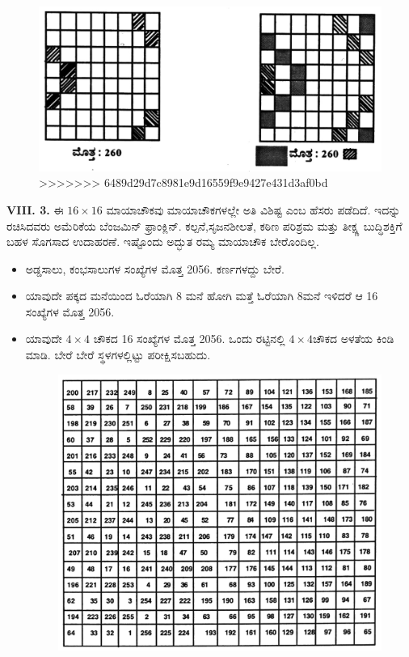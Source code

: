 \begin{figure}[H]
\includegraphics[scale=0.85]{src/figures/chap7/fig7.6.jpg}
>>>>>>> 6489d29d7c8981e9d16559f9e9427e431d3af0bd
\end{figure}

\textbf{VIII. 3.} ಈ $16 \times 16$ ಮಾಯಾಚೌಕವು ಮಾಯಾಚೌಕಗಳಲ್ಲೇ ಅತಿ ವಿಶಿಷ್ಟ ಎಂಬ ಹೆಸರು ಪಡೆದಿದೆ. ಇದನ್ನು ರಚಿಸಿದವರು ಅಮೆರಿಕೆಯ ಬೆಂಜಮಿನ್ ಫ್ರಾಂಕ್ಲಿನ್. ಕಲ್ಪನೆ,\break ಸೃಜನಶೀಲತೆ, ಕಠಿಣ ಪರಿಶ್ರಮ ಮತ್ತು ತೀಕ್ಷ್ಣ ಬುದ್ಧಿಶಕ್ತಿಗೆ ಬಹಳ ಸೊಗಸಾದ ಉದಾಹರಣೆ. ಇಷ್ಟೊಂದು ಅದ್ಭುತ ರಮ್ಯ ಮಾಯಾಚೌಕ ಬೇರೊಂದಿಲ್ಲ.

\begin{itemize}
	\item ಅಡ್ಡಸಾಲು, ಕಂಭಸಾಲುಗಳ ಸಂಖ್ಯೆಗಳ ಮೊತ್ತ 2056. ಕರ್ಣಗಳದ್ದು ಬೇರೆ.
	\item ಯಾವುದೇ ಪಕ್ಕದ ಮನೆಯಿಂದ ಓರೆಯಾಗಿ 8 ಮನೆ ಹೋಗಿ ಮತ್ತೆ ಓರೆಯಾಗಿ 8ಮನೆ ಇಳಿದರೆ ಆ 16 ಸಂಖ್ಯೆಗಳ ಮೊತ್ತ 2056.
	\item ಯಾವುದೇ $4 \times 4$ ಚೌಕದ 16 ಸಂಖ್ಯೆಗಳ ಮೊತ್ತ 2056. ಒಂದು ರಟ್ಟಿನಲ್ಲಿ $4 \times 4$ಚೌಕದ ಅಳತೆಯ ಕಿಂಡಿ ಮಾಡಿ. ಬೇರೆ ಬೇರೆ ಸ್ಥಳಗಳಲ್ಲಿಟ್ಟು ಪರೀಕ್ಷಿಸ\-ಬಹುದು.
	\begin{figure}[H]
	\includegraphics[scale=.9]{src/figures/chap7/fig7-7.jpg}
	\end{figure}
\end{itemize}

